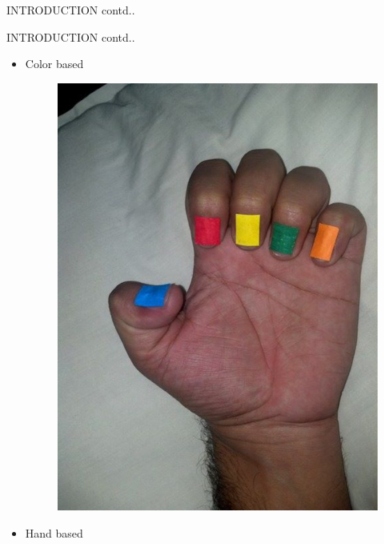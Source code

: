 \documentclass{beamer}
\begin{document}
\begin{frame}{INTRODUCTION contd..}
\begin{itemize}
\begin{figure}
\begin{center}
\end{center}
\end{figure}
 


\end{itemize}
\end{frame}


\begin{frame}{INTRODUCTION contd..}
\begin{itemize}
\item Color based
\begin{figure}
\begin{center}
\includegraphics[scale=0.12]{images/colourhand.jpg}
\end{center}
\end{figure}
\vspace{.5 cm}
\item \alert{Hand based}
\begin{figure}
\begin{center}

\end{center}
\end{figure}
\end{itemize}
\end{frame}
\end{document}
